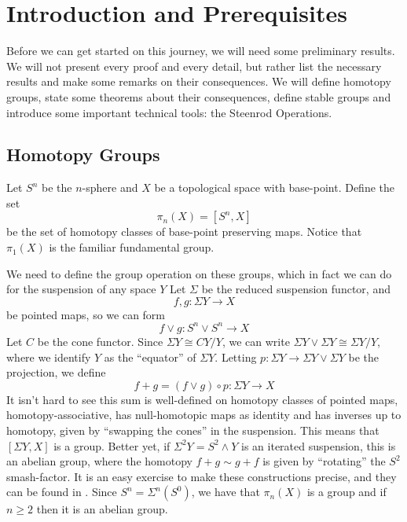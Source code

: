 \section{Introduction and Prerequisites}

Before we can get started on this journey, we will need some preliminary results.  
We will not present every proof and every detail, but rather list the necessary results and make some remarks on their consequences. 
We will define homotopy groups, state some theorems about their consequences, define stable groups and introduce some important technical tools: the Steenrod Operations.

\subsection{Homotopy Groups}

\label{sec:HomotopyIntro}

\begin{Def}
  Let $S^n$ be the $n$-sphere and $X$ be a topological space with base-point.  
  Define the set 
  \[\pi_n(X)=[S^n,X]\]
  be the set of homotopy classes of base-point preserving maps.  
  Notice that $\pi_1(X)$ is the familiar fundamental group.  
\end{Def}

We need to define the group operation on these groups, which in fact we can do for the suspension of any space $Y$
Let $\Sigma$ be the reduced suspension functor, and 
\[f,g:\Sigma Y\to X\]
be pointed maps, so we can form
\[f\vee g :S^n\vee S^n\to X\]
Let $C$ be the cone functor.  
Since $\Sigma Y\cong CY/Y$, we can write $\Sigma Y\vee \Sigma Y\cong \Sigma Y/Y$, where we identify $Y$ as the ``equator'' of $\Sigma Y$.  
Letting $p: \Sigma Y\to \Sigma Y\vee \Sigma Y$ be the projection, we define
\[f+g=(f\vee g)\circ p : \Sigma Y\to X\]
It isn't hard to see this sum is well-defined on homotopy classes of pointed maps, homotopy-associative, has null-homotopic maps as identity and 
has inverses up to homotopy, given by ``swapping the cones'' in the suspension.
This means that $[\Sigma Y,X]$ is a group.  
Better yet, if $\Sigma^2Y=S^2\wedge Y$ is an iterated suspension, this is an abelian group, where the homotopy $f+g\sim g+f$ is given by ``rotating'' the $S^2$ smash-factor.  
It is an easy exercise to make these constructions precise, and they can be found in \cite{HatcherAT}.  Since $S^n=\Sigma^n(S^0)$, we have that $\pi_n(X)$ is a group and if $n\ge 2$ then it is an abelian group.  

